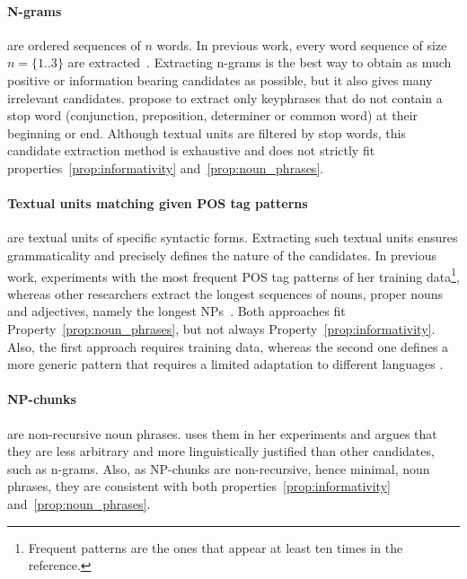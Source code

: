   \paragraph{N-grams} are ordered sequences of $n$ words. In previous work,
  every word sequence of size $n = \{1..3\}$ are
  extracted~\cite{witten1999kea,turney1999learningalgorithms,hulth2003keywordextraction}.
  Extracting n-grams is the best way to obtain as much positive or information
  bearing candidates as possible, but it also gives many irrelevant candidates.
   propose to extract only keyphrases that do not
  contain a stop word (conjunction, preposition, determiner or common word) at
  their beginning or end. Although textual units are filtered by stop words,
  this candidate extraction method is exhaustive and does not strictly fit
  properties~\ref{prop:informativity} and~\ref{prop:noun_phrases}.

  \paragraph{Textual units matching given POS tag patterns} are textual units of
  specific syntactic forms. Extracting such textual units ensures grammaticality
  and precisely defines the nature of the candidates. In previous work,
   experiments with the most frequent POS
  tag patterns of her training data\footnote{Frequent patterns are the ones that
  appear at least ten times in the reference.}, whereas other researchers
  extract the longest sequences of nouns, proper nouns and adjectives, namely
  the longest NPs~\cite{hassan2010conundrums}. Both approaches fit
  Property~\ref{prop:noun_phrases}, but not always
  Property~\ref{prop:informativity}. Also, the first approach requires training
  data, whereas the second one defines a more generic pattern that requires a
  limited adaptation to different languages .

  \paragraph{NP-chunks} are non-recursive noun phrases.
   uses them in her experiments and argues
  that they are less arbitrary and more linguistically justified than other
  candidates, such as n-grams. Also, as NP-chunks are non-recursive, hence
  minimal, noun phrases, they are consistent with both
  properties~\ref{prop:informativity} and~\ref{prop:noun_phrases}.

